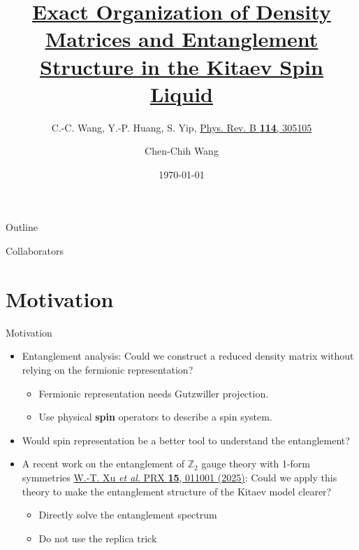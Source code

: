 \documentclass[professionalfont,
                xcolor=dvipsnames]{beamer}
\title{\href{https://arxiv.org/abs/2605.18002}{\textbf{Exact Organization of Density Matrices and Entanglement Structure in the Kitaev Spin Liquid}}}
\subtitle{C.-C. Wang, Y.-P. Huang, S. Yip, \href{https://doi.org/10.1103/cvny-cwj5}{Phys. Rev. B \textbf{114}, 305105}}
\author{Chen-Chih Wang}
\institute{NTHU}
\date{\today}
\begin{document}
\footnotesize %
\begin{frame}
    \titlepage
\end{frame}
\begin{frame}{Outline}
   \tableofcontents
\end{frame}


\begin{frame}{Collaborators}
    
\end{frame}
\section{Motivation}
\begin{frame}{Motivation}
    \begin{itemize}
        \item Entanglement analysis: Could we construct a reduced density matrix without relying on the fermionic representation?
        \begin{itemize}
            \item Fermionic representation needs Gutzwiller projection.
            \item Use physical \textbf{spin} operators to describe a spin system.
        \end{itemize}
        
        \item Would spin representation be a better tool to understand the entanglement? 
        
        \item A recent work on the entanglement of $\mathbb{Z}_2$ gauge theory with 1-form symmetries  \href{https://doi.org/10.1103/PhysRevX.15.011001}{\footnotesize W.-T. Xu \textit{et al}. PRX \textbf{15}, 011001 (2025)}: Could we apply this theory to make the entanglement structure of the Kitaev model clearer?
        \begin{itemize}
            \item Directly solve the entanglement spectrum
            \item Do not use the replica trick
        \end{itemize}
    \end{itemize}
\end{frame}
\end{document}
